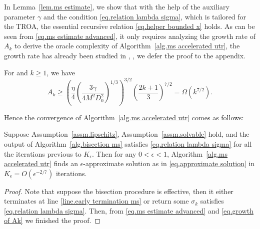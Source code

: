 \documentclass{mcom-l}
\numberwithin{equation}{section}
\begin{document}
In Lemma~\ref{lem.ms estimate}, we show that with the help of the auxiliary parameter $\gamma$ and the condition \eqref{eq.relation lambda sigma}, which is tailored for the TROA, the essential recursive relation \eqref{eq.helper bounded x} holds. As can be seen from \eqref{eq.ms estimate advanced}, it only requires analyzing the growth rate of $A_k$ to derive the oracle complexity of Algorithm~\ref{alg.ms accelerated utr}, the growth rate has already been studied in \citet[Lemma 4.2]{monteiro2013accelerated}, \citet[Lemma 4.3.5]{nesterov_lectures_2018}, we defer the proof to the appendix.
\begin{lemma}
    \label{lem.growth of Ak}
    For and $k\geq 1$, we have
    \begin{equation}
        \label{eq.growth of Ak}
        A_k \geq \left(\frac{\eta}{4}\left (\frac{3\gamma}{4M^2D_0^2}\right)^{1/3}\right)^{3 / 2}\left(\frac{2 k+1}{3}\right)^{7/2} = \Omega(k^{7/2}).
    \end{equation}
\end{lemma}
Hence the convergence of Algorithm~\ref{alg.ms accelerated utr} comes as follows:
\begin{theorem}\label{thm.outer loop complexity}
    Suppose Assumption~\ref{assm.lipschitz},  Assumption~\ref{assm.solvable} hold, and the output of Algorithm~\ref{alg.bisection ms} satisfies \eqref{eq.relation lambda sigma} for all the iterations previous to $K_\epsilon$. Then for any $0<\epsilon<1$, Algorithm~\ref{alg.ms accelerated utr} finds an $\epsilon$-approximate solution as in \eqref{eq.approximate solution} in $K_\epsilon= O(\epsilon^{-2/7})$ iterations.
\end{theorem}
\begin{proof}
    Note that suppose the bisection procedure is effective, then it either terminates at line \ref{line.early termination ms} or return some $\sigma_k$ satisfies \eqref{eq.relation lambda sigma}. Then, from \eqref{eq.ms estimate advanced} and \eqref{eq.growth of Ak} we finished the proof.
\end{proof}
\end{document}
